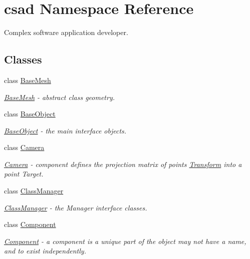 \hypertarget{namespacecsad}{\section{csad Namespace Reference}
\label{namespacecsad}
}


Complex software application developer.  


\subsection*{Classes}
\begin{DoxyCompactItemize}
\item 
class \hyperlink{classcsad_1_1_base_mesh}{Base\-Mesh}
\begin{DoxyCompactList}\small\item\em \hyperlink{classcsad_1_1_base_mesh}{Base\-Mesh} -\/ abstract class geometry. \end{DoxyCompactList}\item 
class \hyperlink{classcsad_1_1_base_object}{Base\-Object}
\begin{DoxyCompactList}\small\item\em \hyperlink{classcsad_1_1_base_object}{Base\-Object} -\/ the main interface objects. \end{DoxyCompactList}\item 
class \hyperlink{classcsad_1_1_camera}{Camera}
\begin{DoxyCompactList}\small\item\em \hyperlink{classcsad_1_1_camera}{Camera} -\/ component defines the projection matrix of points \hyperlink{classcsad_1_1_transform}{Transform} into a point Target. \end{DoxyCompactList}\item 
class \hyperlink{classcsad_1_1_class_manager}{Class\-Manager}
\begin{DoxyCompactList}\small\item\em \hyperlink{classcsad_1_1_class_manager}{Class\-Manager} -\/ the Manager interface classes. \end{DoxyCompactList}\item 
class \hyperlink{classcsad_1_1_component}{Component}
\begin{DoxyCompactList}\small\item\em \hyperlink{classcsad_1_1_component}{Component} -\/ a component is a unique part of the object may not have a name, and to exist independently. \end{DoxyCompactList}\item 

\end{DoxyCompactItemize}
